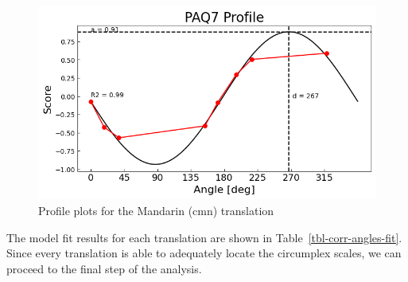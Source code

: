 \documentclass[
  authoryear,
  preprint,
  3p]{elsarticle}
\begin{document}
\begin{figure}
\begin{minipage}[t]{0.25\linewidth}
{\includegraphics{Mitchell_Quasi-Circumplex_files/figure-latex/fig-profile-plots-output-7.png}

}


\end{minipage}%
%
\begin{minipage}[t]{0.25\linewidth}



\end{minipage}%

\caption{\label{fig-profile-plots}Profile plots for the Mandarin (cmn)
translation}

\end{figure}%

The model fit results for each translation are shown in
Table~\ref{tbl-corr-angles-fit}. Since every translation is able to
adequately locate the circumplex scales, we can proceed to the final
step of the analysis.
\end{document}
